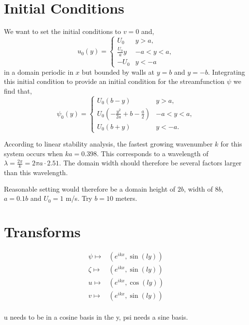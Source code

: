 \documentclass[11pt]{amsart}
\begin{document}
\section{Initial Conditions}

We want to set the initial conditions to $v=0$ and,
\begin{equation}
u_0(y) = \begin{cases}
U_0      &  y>a, \\
\frac{U_0}{a}y      & -a < y < a, \\
- U_0  & y<-a
\end{cases}
\end{equation}
in a domain periodic in $x$ but bounded by walls at $y=b$ and $y=-b$. Integrating this initial condition to provide an initial condition for the streamfunction $\psi$ we find that,
\begin{equation}
\psi_0(y) = \begin{cases}
U_0 \left( b - y \right)      &  y>a, \\
U_0 \left( - \frac{y^2}{2a} + b - \frac{a}{2} \right)    & -a < y < a, \\
U_0 \left( b + y \right)  & y<-a.
\end{cases}
\end{equation}

According to linear stability analysis, the fastest growing wavenumber $k$ for this system occurs when $ka=0.398$. This corresponds to a wavelength of $\lambda = \frac{2 \pi}{k} = 2 \pi a \cdot 2.51$. The domain width should therefore be several factors larger than this wavelength.

Reasonable setting would therefore be a domain height of $2b$, width of $8b$, $a=0.1b$ and $U_0=1$ m/s. Try $b=10$ meters.

\section{Transforms}

\begin{align}
\psi \mapsto& \left( e^{i k x}, \sin (l y) \right) \\
\zeta \mapsto& \left( e^{i k x}, \sin (l y) \right) \\
u \mapsto& \left( e^{i k x}, \cos (l y) \right) \\
v \mapsto& \left( e^{i k x}, \sin (l y) \right) \\
\end{align}

u needs to be in a cosine basis in the y, psi needs a sine basis. 
\end{document}
